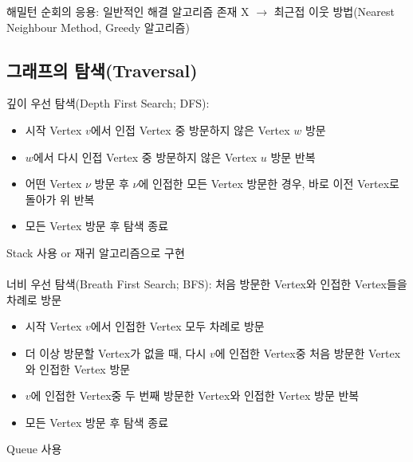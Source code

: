 \newpage
해밀턴 순회의 응용: 일반적인 해결 알고리즘 존재 X $\to$ 최근접 이웃 방법(Nearest Neighbour Method, Greedy 알고리즘)

\subsection{그래프의 탐색(Traversal)}
깊이 우선 탐색(Depth First Search; DFS):
\begin{itemize}
    \item 시작 Vertex $v$에서 인접 Vertex 중 방문하지 않은 Vertex $w$ 방문
    \item $w$에서 다시 인접 Vertex 중 방문하지 않은 Vertex $u$ 방문 반복
    \item 어떤 Vertex $\nu$ 방문 후 $\nu$에 인접한 모든 Vertex 방문한 경우, 바로 이전 Vertex로 돌아가 위 반복
    \item 모든 Vertex 방문 후 탐색 종료
\end{itemize}

Stack 사용 or 재귀 알고리즘으로 구현\\\\
너비 우선 탐색(Breath First Search; BFS): 처음 방문한 Vertex와 인접한 Vertex들을 차례로 방문
\begin{itemize}
    \item 시작 Vertex $v$에서 인접한 Vertex 모두 차례로 방문
    \item 더 이상 방문할 Vertex가 없을 때, 다시 $v$에 인접한 Vertex중 처음 방문한 Vertex와 인접한 Vertex 방문
    \item $v$에 인접한 Vertex중 두 번째 방문한 Vertex와 인접한 Vertex 방문 반복
    \item 모든 Vertex 방문 후 탐색 종료
\end{itemize}

Queue 사용\\\\

